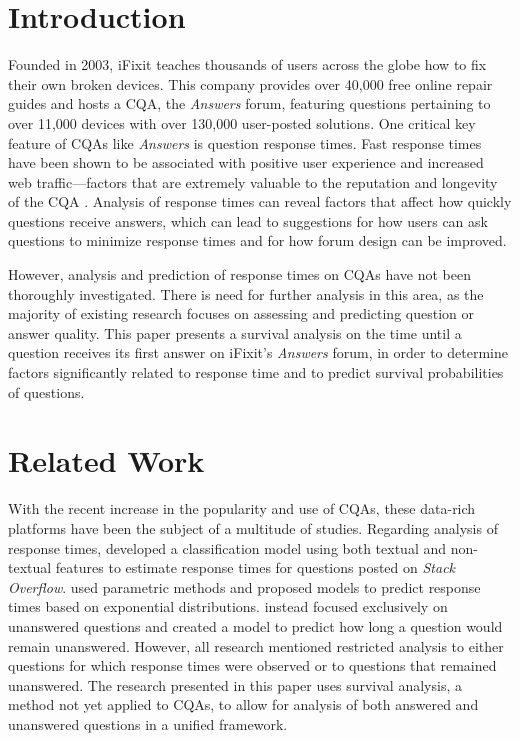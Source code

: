 \documentclass[]{interact}\usepackage[]{graphicx}\usepackage[]{color}
\begin{document}
\section{Introduction}

Founded in 2003, iFixit teaches thousands of users across the globe how to fix their own broken devices. This company provides over 40,000 free online repair guides and hosts a CQA, the \textit{Answers} forum, featuring questions pertaining to over 11,000 devices with over 130,000 user-posted solutions. One critical key feature of CQAs like \textit{Answers} is question response times. Fast response times have been shown to be associated with positive user experience and increased web traffic---factors that are extremely valuable to the reputation and longevity of the CQA \cite{Rechavi2011}. Analysis of response times can reveal factors that affect how quickly questions receive answers, which can lead to suggestions for how users can ask questions to minimize response times and for how forum design can be improved.

However, analysis and prediction of response times on CQAs have not been thoroughly investigated. There is need for further analysis in this area, as the majority of existing research focuses on assessing and predicting question or answer quality. This paper presents a survival analysis on the time until a question receives its first answer on iFixit's \textit{Answers} forum, in order to determine factors significantly related to response time and to predict survival probabilities of questions.


\section{Related Work}

With the recent increase in the popularity and use of CQAs, these data-rich platforms have been the subject of a multitude of studies. Regarding analysis of response times, \cite{Bhat2014} developed a classification model using both textual and non-textual features to estimate response times for questions posted on \textit{Stack Overflow}. \cite{Mahmud2013} used parametric methods and proposed models to predict response times based on exponential distributions. \cite{Asaduzzaman2013} instead focused exclusively on unanswered questions and created a model to predict how long a question would remain unanswered. However, all research mentioned restricted analysis to either questions for which response times were observed or to questions that remained unanswered. The research presented in this paper uses survival analysis, a method not yet applied to CQAs, to allow for analysis of both answered and unanswered questions in a unified framework. 
\end{document}
